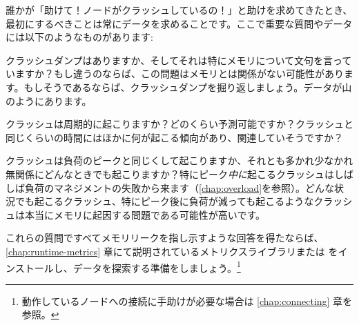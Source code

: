 誰かが「助けて！ノードがクラッシュしているの！」と助けを求めてきたとき、最初にするべきことは常にデータを求めることです。ここで重要な質問やデータには以下のようなものがあります:

\begin{itemize*}
	\item クラッシュダンプはありますか、そしてそれは特にメモリについて文句を言っていますか？もし違うのならば、この問題はメモリとは関係がない可能性があります。もしそうであるならば、クラッシュダンプを掘り返しましょう。データが山のようにあります。
	\item クラッシュは周期的に起こりますか？どのくらい予測可能ですか？クラッシュと同じくらいの時間にはほかに何が起こる傾向があり、関連していそうですか？
	\item クラッシュは負荷のピークと同じくして起こりますか、それとも多かれ少なかれ無関係にどんなときでも起こりますか？特にピーク\emph{中に}起こるクラッシュはしばしば負荷のマネジメントの失敗から来ます（\ref{chap:overload}を参照）。どんな状況でも起こるクラッシュ、特にピーク後に負荷が減っても起こるようなクラッシュは本当にメモリに起因する問題である可能性が高いです。
\end{itemize*}

これらの質問ですべてメモリリークを指し示すような回答を得たならば、\ref{chap:runtime-metrics} 章にて説明されているメトリクスライブラリまたは  をインストールし、データを探索する準備をしましょう。\footnote{動作しているノードへの接続に手助けが必要な場合は \ref{chap:connecting} 章を参照。}

